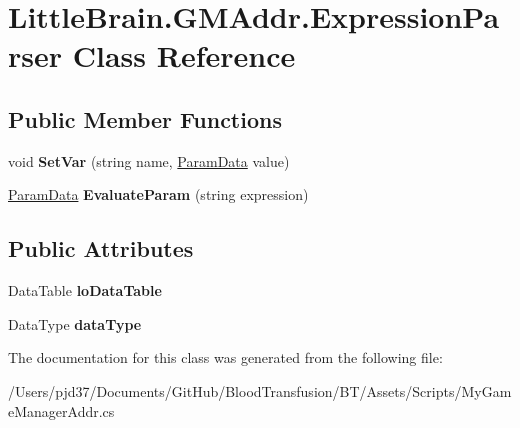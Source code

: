 \hypertarget{class_little_brain_1_1_g_m_addr_1_1_expression_parser}{}\section{Little\+Brain.\+G\+M\+Addr.\+Expression\+Parser Class Reference}
\label{class_little_brain_1_1_g_m_addr_1_1_expression_parser}
\subsection*{Public Member Functions}
\begin{DoxyCompactItemize}
\item 
void {\bfseries Set\+Var} (string name, \hyperlink{class_little_brain_1_1_g_m_addr_1_1_param_data}{Param\+Data} value)\hypertarget{class_little_brain_1_1_g_m_addr_1_1_expression_parser_a9e2d027e9c2e4701540c5b6c049ef990}{}\label{class_little_brain_1_1_g_m_addr_1_1_expression_parser_a9e2d027e9c2e4701540c5b6c049ef990}

\item 
\hyperlink{class_little_brain_1_1_g_m_addr_1_1_param_data}{Param\+Data} {\bfseries Evaluate\+Param} (string expression)\hypertarget{class_little_brain_1_1_g_m_addr_1_1_expression_parser_a918f0c70f5365bafc1be74e3a098636c}{}\label{class_little_brain_1_1_g_m_addr_1_1_expression_parser_a918f0c70f5365bafc1be74e3a098636c}

\end{DoxyCompactItemize}
\subsection*{Public Attributes}
\begin{DoxyCompactItemize}
\item 
Data\+Table {\bfseries lo\+Data\+Table}\hypertarget{class_little_brain_1_1_g_m_addr_1_1_expression_parser_ad9f5194ee47eba569ba6862240316207}{}\label{class_little_brain_1_1_g_m_addr_1_1_expression_parser_ad9f5194ee47eba569ba6862240316207}

\item 
Data\+Type {\bfseries data\+Type}\hypertarget{class_little_brain_1_1_g_m_addr_1_1_expression_parser_ac454623360ed1ca699364f126abb2190}{}\label{class_little_brain_1_1_g_m_addr_1_1_expression_parser_ac454623360ed1ca699364f126abb2190}

\end{DoxyCompactItemize}


The documentation for this class was generated from the following file\+:\begin{DoxyCompactItemize}
\item 
/\+Users/pjd37/\+Documents/\+Git\+Hub/\+Blood\+Transfusion/\+B\+T/\+Assets/\+Scripts/My\+Game\+Manager\+Addr.\+cs\end{DoxyCompactItemize}
